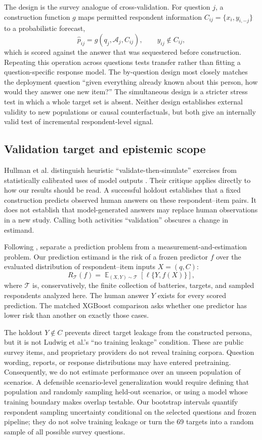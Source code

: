 \documentclass[11pt]{article}
\DeclareMathOperator*{\E}{\mathbb E}
\begin{document}
The design is the survey analogue of cross-validation. For question $j$, a
construction function $g$ maps permitted respondent information
$C_{ij}=\{x_i,y_{i,-j}\}$ to a probabilistic forecast,
\[
 \widehat p_{ij}=g(q_j,\mathcal A_j,C_{ij}),
 \qquad y_{ij}\notin C_{ij},
\]
which is scored against the answer that was sequestered before construction.
Repeating this operation across questions tests transfer rather than fitting a
question-specific response model. The by-question design most closely matches
the deployment question ``given everything already known about this person,
how would they answer one new item?'' The simultaneous design is a stricter
stress test in which a whole target set is absent. Neither design establishes
external validity to new populations or causal counterfactuals, but both give
an internally valid test of incremental respondent-level signal.

\subsection{Validation target and epistemic scope}
Hullman et al. distinguish heuristic ``validate-then-simulate'' exercises from
statistically calibrated uses of model outputs \citep{hullman2026human}. Their
critique applies directly to how our results should be read. A successful
holdout establishes that a fixed construction predicts observed human answers
on these respondent--item pairs. It does not establish that model-generated
answers may replace human observations in a new study. Calling both activities
``validation'' obscures a change in estimand.

Following \citet{ludwig2025llm}, separate a prediction problem from a
measurement-and-estimation problem. Our prediction estimand is the risk of a
frozen predictor $f$ over the evaluated distribution of respondent--item
inputs $X=(q,C)$:
\[
 R_{\mathcal T}(f)=\E_{(X,Y)\sim\mathcal T}
       [\ell\{Y,f(X)\}],
\]
where $\mathcal T$ is, conservatively, the finite collection of batteries,
targets, and sampled respondents analyzed here. The human answer $Y$ exists for
every scored prediction. The matched XGBoost comparison asks whether one
predictor has lower risk than another on exactly those cases.

The holdout $Y\notin C$ prevents direct target leakage from the constructed
persona, but it is not Ludwig et al.'s ``no training leakage'' condition. These
are public survey items, and proprietary providers do not reveal training
corpora. Question wording, reports, or response distributions may have entered
pretraining. Consequently, we do not estimate performance over an unseen
population of scenarios. A defensible scenario-level generalization would
require defining that population and randomly sampling held-out scenarios, or
using a model whose training boundary makes overlap testable. Our bootstrap
intervals quantify respondent sampling uncertainty conditional on the selected
questions and frozen pipeline; they do not solve training leakage or turn the
69 targets into a random sample of all possible survey questions.
\end{document}
